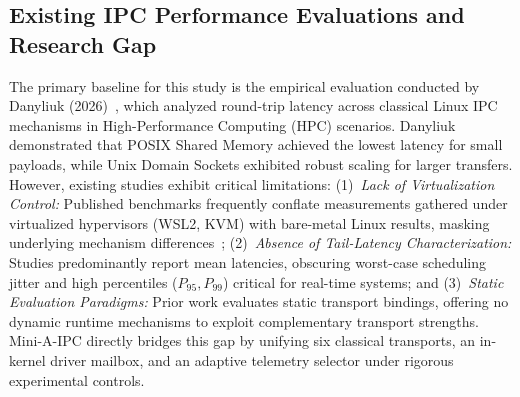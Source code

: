 \subsection{Existing IPC Performance Evaluations and Research Gap}
The primary baseline for this study is the empirical evaluation conducted by Danyliuk (2026)~\cite{danyliuk2026classical}, which analyzed round-trip latency across classical Linux IPC mechanisms in High-Performance Computing (HPC) scenarios. Danyliuk demonstrated that POSIX Shared Memory achieved the lowest latency for small payloads, while Unix Domain Sockets exhibited robust scaling for larger transfers.
However, existing studies exhibit critical limitations:
(1)~\textit{Lack of Virtualization Control:} Published benchmarks frequently conflate measurements gathered under virtualized hypervisors (WSL2, KVM) with bare-metal Linux results, masking underlying mechanism differences~\cite{renault2018efficient};
(2)~\textit{Absence of Tail-Latency Characterization:} Studies predominantly report mean latencies, obscuring worst-case scheduling jitter and high percentiles ($P_{95}, P_{99}$) critical for real-time systems; and
(3)~\textit{Static Evaluation Paradigms:} Prior work evaluates static transport bindings, offering no dynamic runtime mechanisms to exploit complementary transport strengths.
Mini-A-IPC directly bridges this gap by unifying six classical transports, an in-kernel driver mailbox, and an adaptive telemetry selector under rigorous experimental controls.
